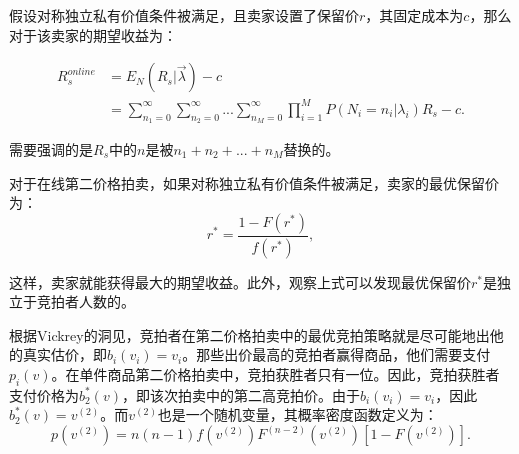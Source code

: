 \begin{defn}[卖家期望收益]
 \label{seller revenue defintion}
	假设对称独立私有价值条件被满足，且卖家设置了保留价$r$，其固定成本为$c$，那么对于该卖家的期望收益为：

	\begin{equation}
	\label{eq:single item expected revenue}
	\begin{aligned}
	R_{s}^{online}&=E_N(R_s|\vec{\lambda})-c\\
	&=\sum_{n_1=0}^{\infty}\sum_{n_2=0}^{\infty}...\sum_{n_M=0}^{\infty}\prod_{i=1}^{M}P(N_i=n_i|\lambda_i)R_s-c.
	\end{aligned}
	\end{equation}

需要强调的是$R_s$中的$n$是被$n_1+n_2+...+n_M$替换的。
\end{defn}

\begin{prop}
\label{proposition1}
对于在线第二价格拍卖，如果对称独立私有价值条件被满足，卖家的最优保留价为：
\begin{equation}
	\label{eq:optimal reserve price}
	r^*=\frac{1-F(r^*)}{f(r^*)},
\end{equation}

这样，卖家就能获得最大的期望收益。此外，观察上式可以发现最优保留价$r^*$是独立于竞拍者人数的。
\end{prop}

根据Vickrey的洞见\cite{Vickrey1961Counterspeculation}，竞拍者在第二价格拍卖中的最优竞拍策略就是尽可能地出他的真实估价，即$b_i(v_i)=v_i$。那些出价最高的竞拍者赢得商品，他们需要支付$p_i(v)$。在单件商品第二价格拍卖中，竞拍获胜者只有一位。因此，竞拍获胜者支付价格为$b^*_2(v)$，即该次拍卖中的第二高竞拍价。由于$b_i(v_i)=v_i$，因此$b^*_2(v)=v^{(2)}$。而$v^{(2)}$也是一个随机变量，其概率密度函数\cite{Riley1981Optimal}定义为：
\begin{equation}
p(v^{(2)})=n(n-1)f(v^{(2)})F^{(n-2)}(v^{(2)})[1-F(v^{(2)})].
\end{equation}

